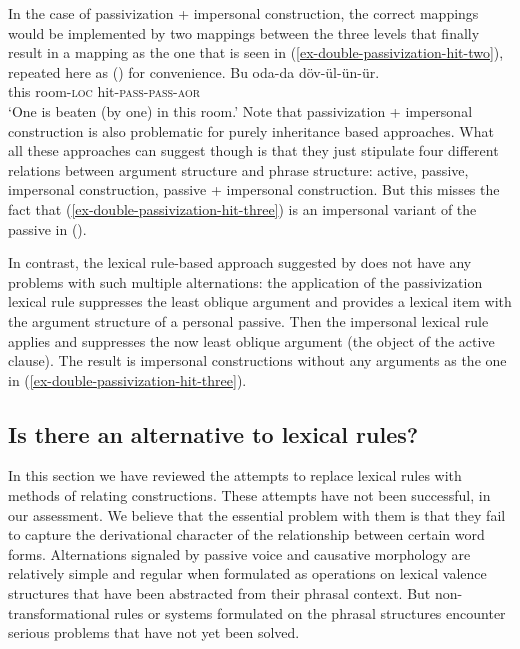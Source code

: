 \begin{exe}
\begin{xlist}[iv.]
\begin{exe}
\begin{xlist}[iv.]
\noindent
In the case of passivization + impersonal construction, the correct mappings would be implemented by two mappings between the three levels
that finally result in a mapping as the one that is seen in (\ref{ex-double-passivization-hit-two}),
repeated here as () for convenience.
\ea
\label{ex-double-passivization-hit-three}
\gll Bu oda-da döv-ül-ün-ür.\\
     this room-\textsc{loc} hit-\textsc{pass}-\textsc{pass}-\textsc{aor}\\
\glt `One is beaten (by one) in this room.'
\z
Note that passivization + impersonal construction is also problematic for purely inheritance based approaches. What
all these approaches can suggest though is that they just stipulate four different relations between
argument structure and phrase structure: active, passive, impersonal construction, passive + impersonal construction. But this misses the fact
that (\ref{ex-double-passivization-hit-three}) is an impersonal variant of the passive in ().

In contrast, the lexical rule-based approach suggested by
\citet{Mueller2003e} does not have any problems with such multiple alternations:
the application of the passivization lexical rule suppresses the least oblique argument and
provides a lexical item with the argument structure of a personal passive. Then the impersonal
lexical rule applies and suppresses the now least oblique argument (the object of the active
clause). The result is impersonal constructions without any arguments as the one in (\ref{ex-double-passivization-hit-three}).




\subsection{Is there an alternative to lexical rules?}
 
In this section we have reviewed the attempts to replace lexical rules with methods of relating
constructions.  These attempts have not been successful, in our assessment.  We believe that the
essential problem with them is that they fail to capture the derivational character of the
relationship between certain word forms.  Alternations signaled by passive voice and causative
morphology are relatively simple and regular when formulated as operations on lexical valence
structures that have been abstracted from their phrasal context.  But non-transformational rules or
systems formulated on the phrasal structures encounter serious problems that have not yet been
solved.


\end{xlist}
\end{exe}
\end{xlist}
\end{exe}
